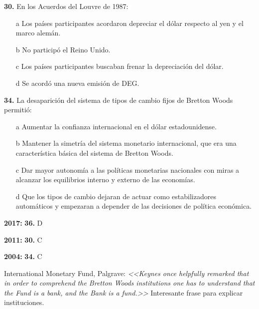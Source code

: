 \documentclass{nuevotema}
\begin{document}
\textbf{30.} En los Acuerdos del Louvre de 1987:

\begin{itemize}
	\item[a] Los países participantes acordaron depreciar el dólar respecto al yen y el marco alemán.
	\item[b] No participó el Reino Unido.
	\item[c] Los países participantes buscaban frenar la depreciación del dólar.
	\item[d] Se acordó una nueva emisión de DEG.
\end{itemize}



\textbf{34.} La desaparición del sistema de tipos de cambio fijos de Bretton Woods permitió:
\begin{itemize}
	\item[a] Aumentar la confianza internacional en el dólar estadounidense.
	\item[b] Mantener la simetría del sistema monetario internacional, que era una característica básica del sistema de Bretton Woods.
	\item[c] Dar mayor autonomía a las políticas monetarias nacionales con miras a alcanzar los equilibrios interno y externo de las economías.
	\item[d] Que los tipos de cambio dejaran de actuar como estabilizadores automáticos y empezaran a depender de las decisiones de política económica.
\end{itemize}

\notas

\textbf{2017:} \textbf{36.} D

\textbf{2011:} \textbf{30.} C

\textbf{2004:} \textbf{34.} C


\bibliografia

International Monetary Fund, Palgrave: \textit{<<Keynes once helpfully remarked that in order to comprehend the Bretton Woods institutions one has to understand that the Fund is a bank, and the Bank is a fund.>>} Interesante frase para explicar instituciones.
\end{document}
